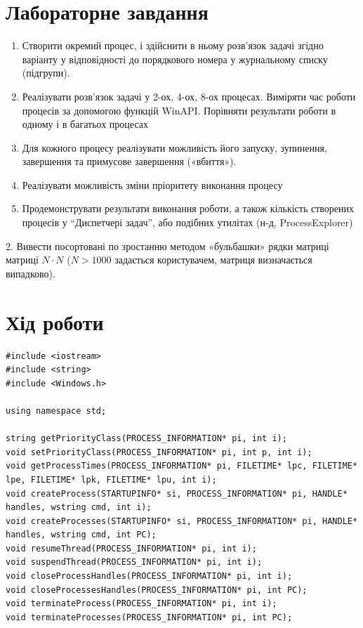 \documentclass{article}
\begin{document}
\begin{normalsize}
	\section*{Лабораторне завдання}
	\begin{enumerate}
		\item Створити окремий процес, і здійснити в ньому розв’язок задачі
		згідно варіанту у відповідності до порядкового номера у
		журнальному списку (підгрупи).
		\item Реалізувати розв’язок задачі у 2-ох, 4-ох, 8-ох процесах. Виміряти
		час роботи процесів за допомогою функцій WinAPI. Порівняти
		результати роботи в одному і в багатьох процесах
		\item Для кожного процесу реалізувати можливість його запуску,
		зупинення, завершення та примусове завершення («вбиття»).
		\item Реалізувати можливість зміни пріоритету виконання процесу
		\item Продемонструвати результати виконання роботи, а також кількість
		створених процесів у “Диспетчері задач”, або подібних утилітах (н-д,
		ProcessExplorer)
	\end{enumerate}
	\begin{center}
		2. Вивести посортовані по зростанню методом «бульбашки» рядки
		матриці матриці $N\cdot N$ ($N>1000$ задається користувачем, матриця
		визначається випадково).
	\end{center}

	\section*{Хід роботи}	
	\begin{lstlisting}                 
#include <iostream>
#include <string>
#include <Windows.h>

using namespace std;

string getPriorityClass(PROCESS_INFORMATION* pi, int i);
void setPriorityClass(PROCESS_INFORMATION* pi, int p, int i);
void getProcessTimes(PROCESS_INFORMATION* pi, FILETIME* lpc, FILETIME* lpe, FILETIME* lpk, FILETIME* lpu, int i);
void createProcess(STARTUPINFO* si, PROCESS_INFORMATION* pi, HANDLE* handles, wstring cmd, int i);
void createProcesses(STARTUPINFO* si, PROCESS_INFORMATION* pi, HANDLE* handles, wstring cmd, int PC);
void resumeThread(PROCESS_INFORMATION* pi, int i);
void suspendThread(PROCESS_INFORMATION* pi, int i);
void closeProcessHandles(PROCESS_INFORMATION* pi, int i);
void closeProcessesHandles(PROCESS_INFORMATION* pi, int PC);
void terminateProcess(PROCESS_INFORMATION* pi, int i);
void terminateProcesses(PROCESS_INFORMATION* pi, int PC);


\end{lstlisting}
\end{normalsize}
\end{document}
